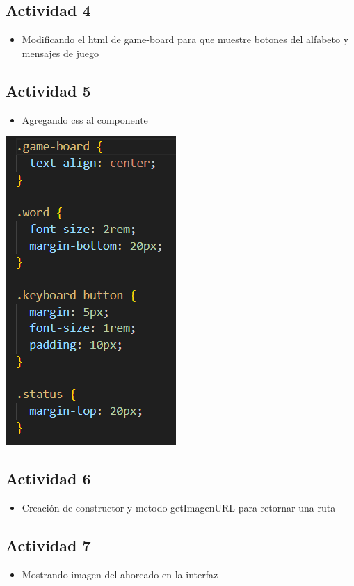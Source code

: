 \documentclass{article}
\begin{document}
          \subsection{Actividad 4}
	\begin{itemize}	
		\item Modificando el html de game-board para que muestre botones del alfabeto y mensajes de juego
	\end{itemize}
        

        
         \subsection{Actividad 5}
	\begin{itemize}	
		\item Agregando css al componente
	\end{itemize}
 \centering
        \includegraphics[width=0.40\linewidth]{Actividad 5.png}  
        
        
        \subsection{Actividad 6}
	\begin{itemize}	
		\item Creación de constructor y metodo getImagenURL para retornar una ruta 
  
	\end{itemize}
        

    \subsection{Actividad 7}
	\begin{itemize}	
		\item Mostrando imagen del ahorcado en la interfaz
	\end{itemize}
           
       
\end{document}
